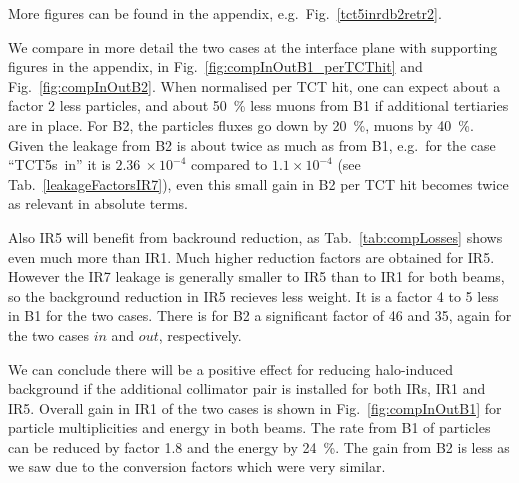 More figures can be found in the appendix, e.g.~Fig.~\ref{tct5inrdb2retr2}.




We compare in more detail the two cases at the interface plane with supporting figures in the appendix, in Fig.~\ref{fig:compInOutB1_perTCThit} and Fig.~\ref{fig:compInOutB2}. When normalised per TCT hit, one can expect about a factor 2 less particles, and about 50~\% less muons from B1 if additional tertiaries are in place. For B2, the particles fluxes go down by 20~\%, muons by 40~\%. Given the leakage from B2 is about twice as much as from B1, e.g.~for the case ``TCT5s~in'' it is $2.36~\times 10^{-4}$ compared to $1.1 \times 10^{-4}$ (see Tab.~\ref{leakageFactorsIR7}), even this small gain in B2 per TCT hit becomes twice as relevant in absolute terms.

Also IR5 will benefit from backround reduction, as Tab.~\ref{tab:compLosses} shows even much more than IR1. Much higher reduction factors are obtained for IR5. However the IR7 leakage is generally smaller to IR5 than to IR1 for both beams, so the background reduction in IR5 recieves less weight. It is a factor 4 to 5 less in B1 for the two cases. There is for B2 a significant factor of 46 and 35, again for the two cases $in$ and $out$, respectively.

We can conclude there will be a positive effect for reducing halo-induced background if the additional collimator pair is installed for both IRs, IR1 and IR5.
Overall gain in IR1 of the two cases is shown in Fig.~\ref{fig:compInOutB1} for particle multiplicities and energy in both beams. The rate from B1 of particles can be reduced by factor 1.8 and the energy by 24~\%. The gain from B2 is less as we saw due to the conversion factors which were very similar.

